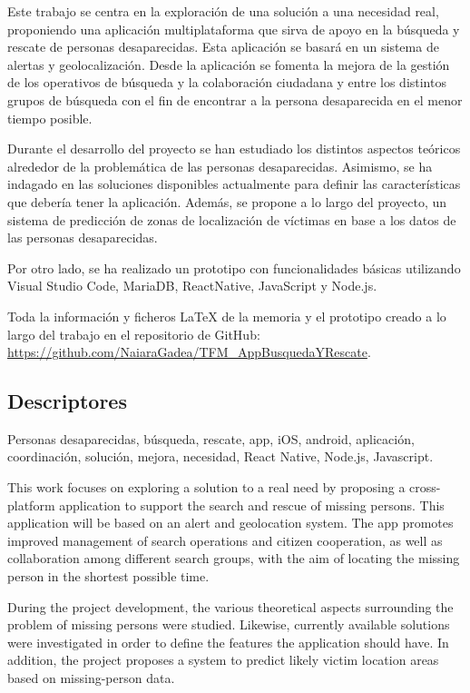 \documentclass{pclass}
\begin{document}
Este trabajo se centra en la exploración de una solución a una necesidad real, proponiendo una aplicación multiplataforma que sirva de apoyo en la búsqueda y rescate de personas desaparecidas. Esta aplicación se basará en un sistema de alertas y geolocalización. Desde la aplicación se fomenta la mejora de la gestión de los operativos de búsqueda y la colaboración ciudadana y entre los distintos grupos de búsqueda con el fin de encontrar a la persona desaparecida en el menor tiempo posible.

Durante el desarrollo del proyecto se han estudiado los distintos aspectos teóricos alrededor de la problemática de las personas desaparecidas. Asimismo, se ha indagado en las soluciones disponibles actualmente para definir las características que debería tener la aplicación. Además, se propone a lo largo del proyecto, un sistema de predicción de zonas de localización de víctimas en base a los datos de las personas desaparecidas.

Por otro lado, se ha realizado un prototipo con funcionalidades básicas utilizando Visual Studio Code, MariaDB, ReactNative, JavaScript y Node.js.

Toda la información y ficheros LaTeX de la memoria y el prototipo creado a lo largo del trabajo en el repositorio de GitHub: \url{https://github.com/NaiaraGadea/TFM_AppBusquedaYRescate}.



{\centering \subsection*{Descriptores} }
Personas desaparecidas, búsqueda, rescate, app, iOS, android, aplicación, coordinación, solución, mejora, necesidad, React Native, Node.js, Javascript.




This work focuses on exploring a solution to a real need by proposing a cross-platform application to support the search and rescue of missing persons. This application will be based on an alert and geolocation system. The app promotes improved management of search operations and citizen cooperation, as well as collaboration among different search groups, with the aim of locating the missing person in the shortest possible time.

During the project development, the various theoretical aspects surrounding the problem of missing persons were studied. Likewise, currently available solutions were investigated in order to define the features the application should have. In addition, the project proposes a system to predict likely victim location areas based on missing-person data.
\end{document}
